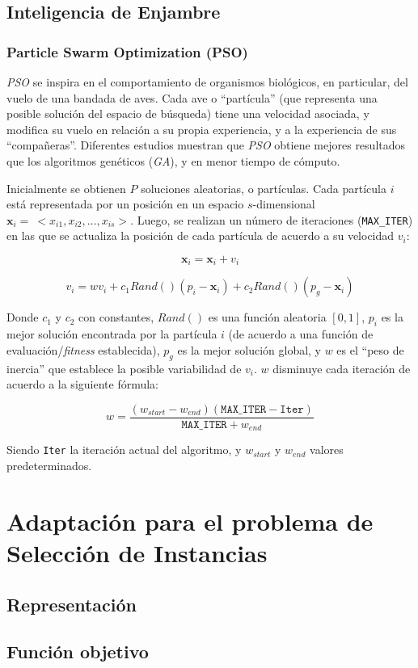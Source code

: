 \subsection{Inteligencia de Enjambre}

\subsubsection{Particle Swarm Optimization (PSO)}

\emph{PSO} se inspira en el comportamiento de organismos biológicos, en particular, del vuelo de una bandada de aves. Cada ave o ``partícula'' (que representa una posible solución del espacio de búsqueda) tiene una velocidad asociada, y modifica su vuelo en relación a su propia experiencia, y a la experiencia de sus ``compañeras''. Diferentes estudios muestran que \emph{PSO} obtiene mejores resultados que los algoritmos genéticos (\emph{GA}), y en menor tiempo de cómputo.

Inicialmente se obtienen $P$ soluciones aleatorias, o partículas. Cada partícula $i$ está representada por un posición en un espacio $s$-dimensional \linebreak $\textbf{x}_i =\ <x_{i1},x_{i2},\dots,x_{is}>$. Luego, se realizan un número de iteraciones (\texttt{MAX\_ITER}) en las que se actualiza la posición de cada partícula de acuerdo a su velocidad $v_i$:

$$\textbf{x}_i = \textbf{x}_i + v_i$$

$$v_i = w v_i + c_1 Rand() (p_i - \textbf{x}_i) +  c_2 Rand() (p_g - \textbf{x}_i)$$

Donde $c_1$ y $c_2$ con constantes, $Rand()$ es una función aleatoria $[0,1]$, $p_i$ es la mejor solución encontrada por la partícula $i$ (de acuerdo a una función de evaluación/\emph{fitness} establecida), $p_g$ es la mejor solución global, y $w$ es el ``peso de inercia'' que establece la posible variabilidad de $v_i$. $w$ disminuye cada iteración de acuerdo a la siguiente fórmula:

$$w = \frac{(w_{start} - w_{end})(\texttt{MAX\_ITER} - \texttt{Iter})}{\texttt{MAX\_ITER} + w_{end}}$$

Siendo \texttt{Iter} la iteración actual del algoritmo, y $w_{start}$ y $w_{end}$ valores predeterminados.

\section{Adaptación para el problema de Selección de Instancias}

\subsection{Representación}

\subsection{Función objetivo}
